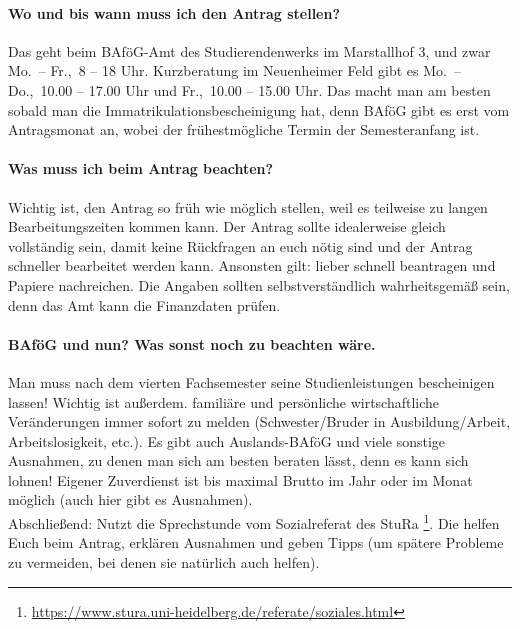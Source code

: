 \paragraph{Wo und bis wann muss ich den Antrag stellen?}
Das geht beim BAföG-Amt des Studierendenwerks im Marstallhof 3, und zwar Mo.\ -- Fr.,\ 8 -- 18 Uhr. Kurzberatung im Neuenheimer Feld gibt es Mo.\ -- Do.,\ 10.00 -- 17.00 Uhr und Fr.,\ 10.00 -- 15.00 Uhr. Das macht man am besten sobald man die Immatrikulationsbescheinigung hat, denn BAföG gibt es erst vom Antragsmonat an, wobei der frühestmögliche Termin der Semesteranfang ist.

\paragraph{Was muss ich beim Antrag beachten?}
Wichtig ist, den Antrag so früh wie möglich stellen, weil es teilweise zu langen Bearbeitungszeiten kommen kann. Der Antrag sollte idealerweise gleich vollständig sein, damit keine Rückfragen an euch nötig sind und der Antrag schneller bearbeitet werden kann. Ansonsten gilt: lieber schnell beantragen und Papiere nachreichen. Die Angaben sollten selbstverständlich wahrheitsgemäß sein, denn das Amt kann die Finanzdaten prüfen.

\paragraph{BAföG und nun? Was sonst noch zu beachten wäre.}
Man muss nach dem vierten Fachsemester seine Studienleistungen bescheinigen lassen! Wichtig ist außerdem. familiäre und persönliche wirtschaftliche Veränderungen immer sofort zu melden (Schwester/Bruder in Ausbildung/Arbeit, Arbeitslosigkeit, etc.). Es gibt auch Auslands-BAföG und viele sonstige Ausnahmen, zu denen man sich am besten beraten lässt, denn es kann sich lohnen! Eigener Zuverdienst ist bis maximal  Brutto im Jahr oder  im Monat möglich (auch hier gibt es Ausnahmen).\\[5mm]

\noindent Abschließend: Nutzt die Sprechstunde vom Sozialreferat des \gls{StuRa} \footnote{\url{https://www.stura.uni-heidelberg.de/referate/soziales.html}}. Die helfen Euch beim Antrag, erklären Ausnahmen und geben Tipps (um spätere Probleme zu vermeiden, bei denen sie natürlich auch helfen).
